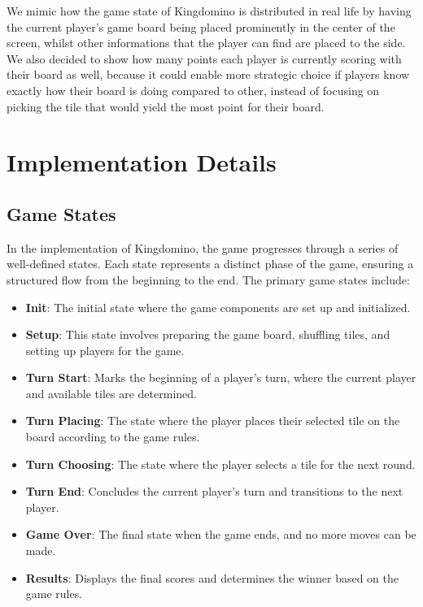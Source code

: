 \documentclass[conference]{IEEEtran}
\begin{document}
We mimic how the game state of Kingdomino is distributed in real life by having the current player's game board being placed prominently in the center of the screen, whilst other informations that the player can find are placed to the side. We also decided to show how many points each player is currently scoring with their board as well, because it could enable more strategic choice if players know exactly how their board is doing compared to other, instead of focusing on picking the tile that would yield the most point for their board.

\section{Implementation Details}

\subsection{Game States}

In the implementation of Kingdomino, the game progresses through a series of
well-defined states. Each state represents a distinct phase of the game,
ensuring a structured flow from the beginning to the end. The primary game
states include:

\begin{itemize}
    \item \textbf{Init}: The initial state where the game components are set up and initialized.
    \item \textbf{Setup}: This state involves preparing the game board, shuffling tiles, and setting up players for the game.
    \item \textbf{Turn Start}: Marks the beginning of a player's turn, where the current player and available tiles are determined.
    \item \textbf{Turn Placing}: The state where the player places their selected tile on the board according to the game rules.
    \item \textbf{Turn Choosing}: The state where the player selects a tile for the next round.
    \item \textbf{Turn End}: Concludes the current player's turn and transitions to the next player.
    \item \textbf{Game Over}: The final state when the game ends, and no more moves can be made.
    \item \textbf{Results}: Displays the final scores and determines the winner based on the game rules.
\end{itemize}
\end{document}
